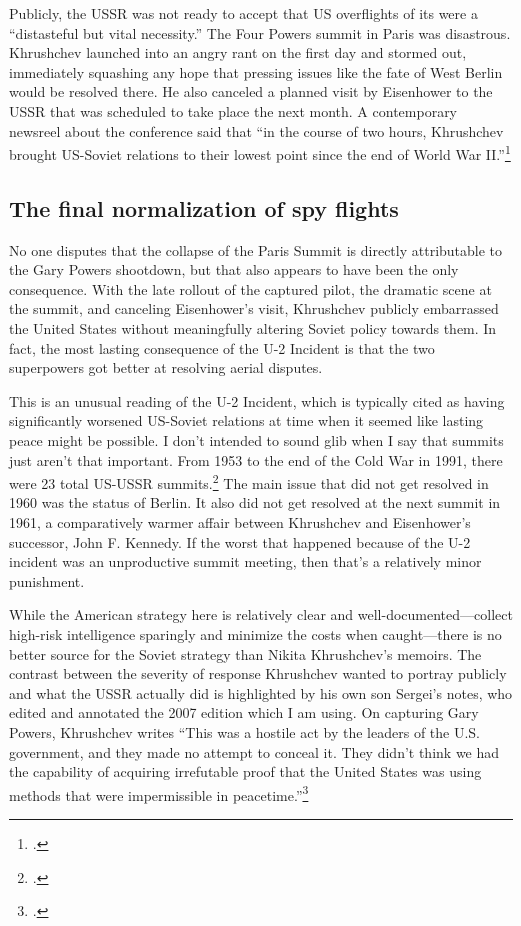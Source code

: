 \documentclass{report}
\begin{document}
\begin{refsegment}
Publicly, the USSR was not ready to accept that US overflights of its were a ``distasteful but vital necessity.'' The Four Powers summit in Paris was disastrous. Khrushchev launched into an angry rant on the first day and stormed out, immediately squashing any hope that pressing issues like the fate of West Berlin would be resolved there. He also canceled a planned visit by Eisenhower to the USSR that was scheduled to take place the next month. A contemporary newsreel about the conference said that ``in the course of two hours, Khrushchev brought US-Soviet relations to their lowest point since the end of World War II.''\footcite{universal_studios_summit_1960}

\subsection{The final normalization of spy flights}
No one disputes that the collapse of the Paris Summit is directly attributable to the Gary Powers shootdown, but that also appears to have been the only consequence. With the late rollout of the captured pilot, the dramatic scene at the summit, and canceling Eisenhower's visit, Khrushchev publicly embarrassed the United States without meaningfully altering Soviet policy towards them. In fact, the most lasting consequence of the U-2 Incident is that the two superpowers got better at resolving aerial disputes.

This is an unusual reading of the U-2 Incident, which is typically cited as having significantly worsened US-Soviet relations at time when it seemed like lasting peace might be possible. I don't intended to sound glib when I say that summits just aren't that important. From 1953 to the end of the Cold War in 1991, there were 23 total US-USSR summits.\footcite{fain_chronology_2011} The main issue that did not get resolved in 1960 was the status of Berlin. It also did not get resolved at the next summit in 1961, a comparatively warmer affair between Khrushchev and Eisenhower's successor, John F. Kennedy. If the worst that happened because of the U-2 incident was an unproductive summit meeting, then that's a relatively minor punishment.


While the American strategy here is relatively clear and well-documented---collect high-risk intelligence sparingly and minimize the costs when caught---there is no better source for the Soviet strategy than Nikita Khrushchev's memoirs. The contrast between the severity of response Khrushchev wanted to portray publicly and what the USSR actually did is highlighted by his own son Sergei's notes, who edited and annotated the 2007 edition which I am using.  On capturing Gary Powers, Khrushchev writes ``This was a hostile act by the leaders of the U.S. government, and they made no attempt to conceal it. They didn't think we had the capability of \textelp{} acquiring irrefutable proof that the United States was using methods that were impermissible in peacetime.''\footcite[p.~239]{khrushchev_memoirs_2007}


\end{refsegment}
\end{document}
